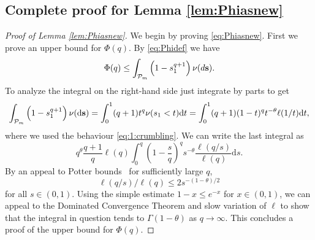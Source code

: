 \documentclass[a4,12pt]{amsart}
\numberwithin{equation}{section}
\newcommand{\MassP}{\mathcal{P}_{\rm m}}
\begin{document}
\begin{appendix}
\subsection{Complete proof for Lemma \ref{lem:Phiasnew}}
\label{sec:Phiasnewproof}
\begin{proof}[Proof of Lemma \ref{lem:Phiasnew}]
	We begin by proving \eqref{eq:Phiasnew}. \color{black} First we prove an upper bound for $\Phi(q)$. By \eqref{eq:Phidef} we have 
		\begin{equation*}
			\Phi(q) \leq \int_{\MassP} \left( 1 - s_1^{q+1} \right)\nu (\rm d \mathbf{s}).
		\end{equation*}
		To analyze the integral on the right-hand side just integrate by parts to get
		\begin{equation*}
			\int_{\MassP}\left(1-s_1^{q+1}\right) \nu(\mathrm{d} \mathbf{s}) = 
			\int_0^1 (q+1) t^{q} \nu(s_1 < t) \mathrm{d} t =
			\int_0^1 (q+1) (1-t)^q t^{-\theta}\ell(1/t) \mathrm{d} t,
		\end{equation*}
        where we used the behaviour \eqref{eq:1:crumbling}. 
		We can write the last integral as
		\begin{equation*}
			q^{\theta} \frac{q+1}{q} \ell(q)
			\int_0^q \left(1-\frac sq \right)^q s^{-\theta} \frac{\ell(q/s)}{\ell(q)} \mathrm{d} s.
		\end{equation*}
		By an appeal to Potter bounds~\cite[Theorem 1.5.6 (i)]{bingham1989regular} 
		for sufficiently large $q$,
		\begin{equation*}
			\ell(q/s) / \ell(q) \leq 2 s^{ -(1-\theta)/2}
		\end{equation*}
		for all $s \in (0,1)$. Using the simple estimate $1-x\leq e^{-x}$ for $x \in (0,1)$, we can appeal to 
		the Dominated Convergence Theorem and slow variation of $\ell$ 
		to show that the integral in question tends to $\Gamma(1-\theta)$ as $q \to \infty$.
		This concludes a proof of the upper bound for $\Phi(q)$.


\end{proof}
\end{appendix}
\end{document}
